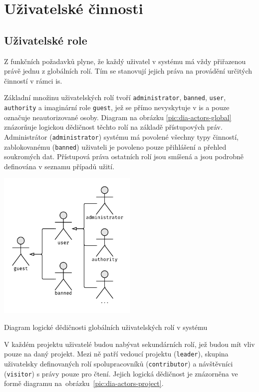 \section{Uživatelské činnosti}

\subsection{Uživatelské role}

Z funkčních požadavků plyne, že každý uživatel v systému má vždy přiřazenou právě jednu z globálních rolí. Tím se stanovují jejich práva na provádění určitých činností v rámci \gls{is}.

Základní množinu uživatelských rolí tvoří \texttt{administrator}, \texttt{banned}, \texttt{user}, \texttt{authority} a imaginární role \texttt{guest}, jež se přímo nevyskytuje v \gls{is} a pouze označuje neautorizované osoby. Diagram na obrázku \ref{pic:dia-actors-global} znázorňuje logickou dědičnost těchto rolí na základě přístupových práv. Administrátor (\texttt{administrator}) systému má povolené všechny typy činností, zablokovanému (\texttt{banned}) uživateli je povoleno pouze přihlášení a přehled soukromých dat. Přístupová práva ostatních rolí jsou smíšená a jsou podrobně definována v seznamu případů užití.


\begin{fig:illustration}
   \includegraphics[width=0.5\textwidth]{images/dia-actors-global.pdf}
   \caption{Diagram logické dědičnosti globálních uživatelských rolí v systému}\label{pic:dia-actors-global}
\end{fig:illustration}


V každém projektu uživatelé budou nabývat sekundárních rolí, jež budou mít vliv pouze na daný projekt. Mezi ně patří vedoucí projektu (\texttt{leader}), skupina uživatelsky definovaných rolí spolupracovníků (\texttt{contributor}) a návštěvníci (\texttt{visitor}) s právy pouze pro čtení. Jejich logická dědičnost je znázorněna ve formě diagramu na~obrázku~\ref{pic:dia-actors-project}.


